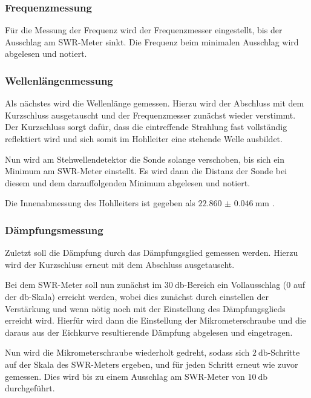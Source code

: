             \subsubsection{Frequenzmessung}
                Für die Messung der Frequenz wird der Frequenzmesser eingestellt, bis der Ausschlag am SWR-Meter sinkt.
                Die Frequenz beim minimalen Ausschlag wird abgelesen und notiert.
                
            \subsubsection{Wellenlängenmessung\label{sssec:4.2.2}}
                Als nächstes wird die Wellenlänge gemessen.
                Hierzu wird der Abschluss mit dem Kurzschluss ausgetauscht und der Frequenzmesser zunächst wieder verstimmt.
                Der Kurzschluss sorgt dafür, dass die eintreffende Strahlung fast vollständig reflektiert wird und sich somit im Hohlleiter eine stehende Welle ausbildet.
                
                Nun wird am Stehwellendetektor die Sonde solange verschoben, bis sich ein Minimum am SWR-Meter einstellt.
                Es wird dann die Distanz der Sonde bei diesem und dem darauffolgenden Minimum abgelesen und notiert.
                
                Die Innenabmessung des Hohlleiters ist gegeben als $\SI{22.860(46)}{\milli\meter}$ \cite{Mikro} .

            \subsubsection{Dämpfungsmessung}
                Zuletzt soll die Dämpfung durch das Dämpfungsglied gemessen werden.
                Hierzu wird der Kurzschluss erneut mit dem Abschluss ausgetauscht.
                
                Bei dem SWR-Meter soll nun zunächst im $\SI{30}{\decibel}$-Bereich ein Vollausschlag ($0$ auf der $\si{\decibel}$-Skala) erreicht werden, wobei dies zunächst durch einstellen der Verstärkung und wenn nötig noch mit der Einstellung des Dämpfungsglieds erreicht wird.
                Hierfür wird dann die Einstellung der Mikrometerschraube und die daraus aus der Eichkurve resultierende Dämpfung abgelesen und eingetragen.
                
                Nun wird die Mikrometerschraube wiederholt gedreht, sodass sich $\SI{2}{\decibel}$-Schritte auf der Skala des SWR-Meters ergeben, und für jeden Schritt erneut wie zuvor gemessen.
                Dies wird bis zu einem Ausschlag am SWR-Meter von $\SI{10}{\decibel}$ durchgeführt.

